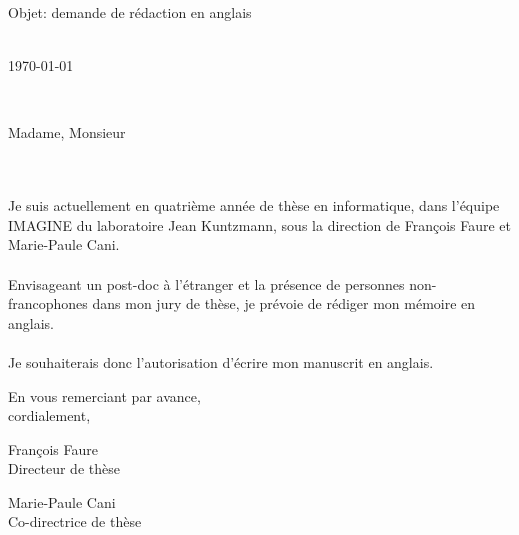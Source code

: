 \documentclass[11pt,a4paper]{letter} %
\def\opening#1{\thispagestyle{empty}
{\centering\fromaddress \vspace{1.0cm} \\ %
\vspace{2cm}
\hspace*{\longindentation}\today\hspace*{\fill}\par} %
\vspace{2cm}
{\raggedright \toname \\ \toaddress \par} %
\vspace{1.5cm}
\noindent #1 %
}
\begin{document}

\begin{letter}
{Objet: demande de rédaction en anglais}


\opening{Madame, Monsieur}
\\\\
\indent Je suis actuellement en quatrième année de thèse en informatique, dans l'équipe IMAGINE du laboratoire Jean Kuntzmann, sous la direction de François Faure et Marie-Paule Cani.
\\\\
\indent Envisageant un post-doc à l'étranger et la présence de personnes non-francophones dans mon jury de thèse, je prévoie de rédiger mon mémoire en anglais.
\\\\
\indent Je souhaiterais donc l'autorisation d'écrire mon manuscrit en anglais.

\closing{En vous remerciant par avance, \\ cordialement,}

\vspace{2cm}
\parbox[b][1cm][c]{5cm}{\centering François Faure \\ Directeur de thèse}
\parbox[b][1cm][c]{5cm}{\centering Marie-Paule Cani\\ Co-directrice de thèse}


\end{letter}
\end{document}
